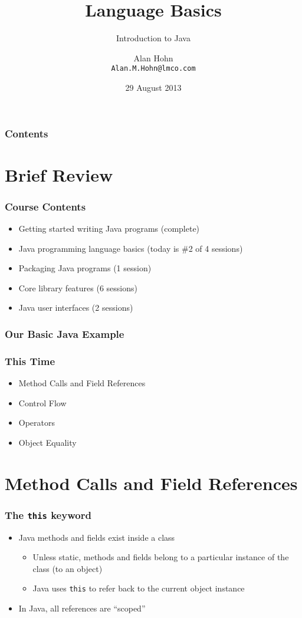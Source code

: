 \documentclass{beamer}
\title[]{Language Basics}
\subtitle{Introduction to Java}
\author{Alan Hohn\\
\texttt{Alan.M.Hohn@lmco.com}}
\date{29 August 2013}
\begin{document}
\begin{frame}
   \titlepage
\end{frame}

\begin{frame}
   \frametitle{Contents}
   \tableofcontents[]
\end{frame}

\section{Brief Review}
\begin{frame}
\frametitle{Course Contents}
\begin{itemize}
\item Getting started writing Java programs (complete)
\item Java programming language basics (today is \#2 of 4 sessions)
\item Packaging Java programs (1 session)
\item Core library features (6 sessions)
\item Java user interfaces (2 sessions)
\end{itemize}
\end{frame}

\begin{frame}[fragile]
\frametitle{Our Basic Java Example}

\end{frame}

\begin{frame}
\frametitle{This Time}
\begin{itemize}
\item Method Calls and Field References
\item Control Flow
\item Operators
\item Object Equality
\end{itemize}
\end{frame}

\section{Method Calls and Field References}
\begin{frame}
\frametitle{The \texttt{this} keyword}
\begin{itemize}
\item Java methods and fields exist inside a class
\begin{itemize}
\item Unless static, methods and fields belong to a particular instance of the class (to an object)
\item Java uses \texttt{this} to refer back to the current object instance
\end{itemize}
\item In Java, all references are ``scoped''
\end{itemize}
\end{frame}
\end{document}
